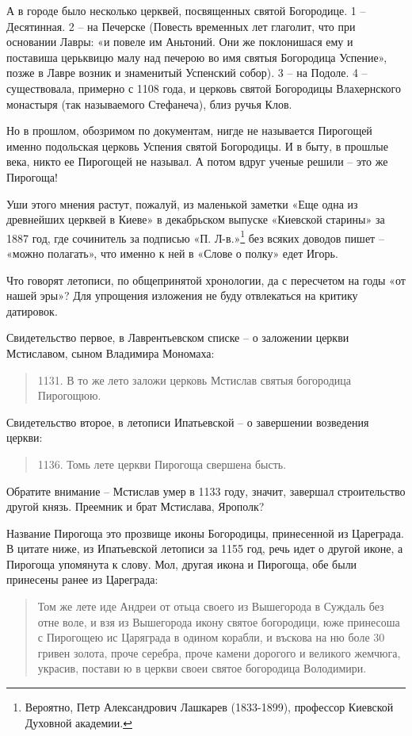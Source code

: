 А в городе было несколько церквей, посвященных святой Богородице. 1 – Десятинная. 2 – на Печерске (Повесть временных лет глаголит, что при основании Лавры: «и повеле им Аньтоний. Они же поклонишася ему и поставиша церьквицю малу над печерою во имя святыя Богородица Успение», позже в Лавре возник и знаменитый Успенский собор). 3 – на Подоле. 4 – существовала, примерно с 1108 года, и церковь святой Богородицы Влахернского монастыря (так называемого Стефанеча), близ ручья Клов. 

Но в прошлом, обозримом по документам, нигде не называется Пирогощей именно подольская церковь Успения святой Богородицы. И в быту, в прошлые века, никто ее Пирогощей не называл. А потом вдруг ученые решили – это же Пирогоща!

Уши этого мнения растут, пожалуй, из маленькой заметки «Еще одна из древнейших церквей в Киеве» в декабрьском выпуске «Киевской старины» за 1887 год, где сочинитель за подписью «П. Л-в.»\footnote{Вероятно, Петр Александрович Лашкарев (1833-1899), профессор Киевской Духовной академии.} без всяких доводов пишет – «можно полагать», что именно к ней в «Слове о полку» едет Игорь.

Что говорят летописи, по общепринятой хронологии, да с пересчетом на годы «от нашей эры»? Для упрощения изложения не буду отвлекаться на критику датировок.
 
Свидетельство первое, в Лаврентьевском списке – о заложении церкви Мстиславом, сыном Владимира Мономаха:

\begin{quotation}
1131. В то же лето заложи церковь Мстислав святыя богородица Пирогощюю.
\end{quotation}

Свидетельство второе, в летописи Ипатьевской – о завершении возведения церкви:

\begin{quotation}
1136. Томь лете церкви Пирогоща свершена бысть. \end{quotation}

Обратите внимание – Мстислав умер в 1133 году, значит, завершал строительство другой князь. Преемник и брат Мстислава, Ярополк?

Название Пирогоща это прозвище иконы Богородицы, принесенной из Цареграда. В цитате ниже, из Ипатьевской летописи за 1155 год, речь идет о другой иконе, а Пирогоща упомянута к слову. Мол, другая икона и Пирогоща, обе были принесены ранее из Цареграда:

\begin{quotation}
Том же лете иде Андреи от отьца своего из Вышегорода в Суждаль без отне воле, и взя из Вышегорода икону святое богородици, юже принесоша с Пирогощею ис Царяграда в одином корабли, и въскова на ню боле 30 гривен золота, проче серебра, проче камени дорогого и великого жемчюга, украсив, постави ю в церкви своеи святое богородица Володимири.
\end{quotation}

